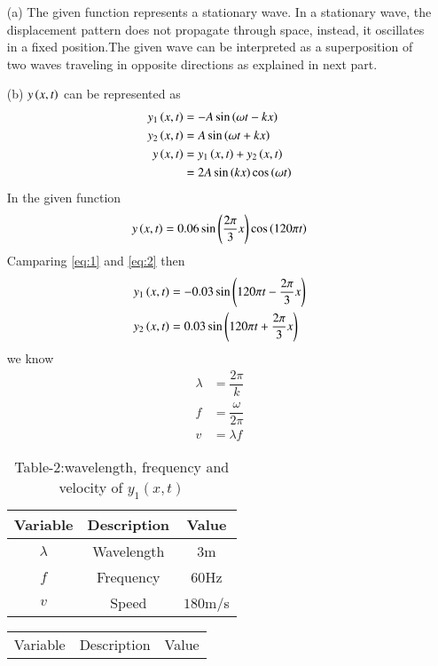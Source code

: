 \documentclass[journal,12pt,twocolumn]{IEEEtran}
\theoremstyle{remark}
\begin{document}
\begin{enumerate}
\item[(a)] The given function represents a stationary wave. In a stationary wave, the displacement pattern does not propagate through space, instead, it oscillates in a fixed position.The given wave can be interpreted as a superposition of two waves traveling in opposite directions as explained in next part.
\item[(b)] $y\left(x,t\right)$ can be represented as
\begin{align} 
y_1\left(x, t\right) &= -A \sin{\ensuremath{\left( \omega t - kx\right)}}\\ 
y_2\left(x, t\right) &= A \sin{\ensuremath{\left(\omega t + kx\right)}} \\
y\left(x,t\right) &= y_1\left(x,t\right) + y_2\left(x,t\right)\\
&= 2A\sin{\ensuremath{\left(kx\right)}}\cos{\ensuremath{\left(\omega t\right)}}
\label{eq:1}
\end{align} 
In the given function 
\begin{align}
y\left(x, t\right) = 0.06 \sin{\ensuremath{\left(\dfrac{2\pi}{3}x\right)}} \cos{\ensuremath{\left(120 \pi t\right)}} \label{eq:2}
\end{align}
Camparing \eqref{eq:1} and \eqref{eq:2} then
\begin{align} 
y_1\left(x, t\right) &= -0.03 \sin{\ensuremath{\left(120\pi t - \dfrac{2\pi}{3}x\right)}}\\ 
y_2\left(x, t\right) &= 0.03 \sin{\ensuremath{\left( 120\pi t + \dfrac{2\pi}{3}x\right)}}
\end{align}
we know
\begin{align}
\lambda &= \dfrac{2\pi}{k}\\
f &= \dfrac{\omega}{2\pi}\\
v &= \lambda f
\end{align}
\begin{table}[h]
  \centering
  \begin{tabular}{|c|c|c|}
    \hline
    Variable & Description & Value \\
    \hline
    $\lambda$ & Wavelength & $3$m\\
    \hline
    $f$ & Frequency & $60$Hz \\
    \hline
    $v$ & Speed & $180$m/s\\
    \hline
  \end{tabular}
  \caption{Table-2:wavelength, frequency and velocity of $y_1(x,t)$}
  \label{tab:mytable1}
\end{table}
\begin{table}[h]
  \centering
  \begin{tabular}{|c|c|c|}
    \hline
    Variable & Description & Value \\

\end{tabular}
\end{table}
\end{enumerate}
\end{document}
